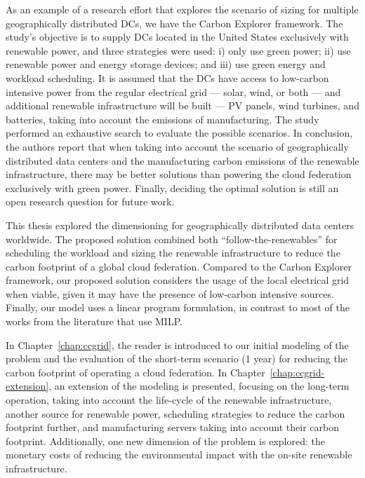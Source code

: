 As an example of a research effort that explores the scenario of sizing for multiple geographically distributed DCs, we have the Carbon Explorer framework\cite{acun2022holistic}. The study's objective is to supply DCs located in the United States exclusively with renewable power, and three strategies were used: i) only use green power; ii) use renewable power and energy storage devices; and iii) use green energy and workload scheduling. It is assumed that the DCs have access to low-carbon intensive power from the regular electrical grid --- solar, wind, or both --- and additional renewable infrastructure will be built --- PV panels, wind turbines, and batteries, taking into account the emissions of manufacturing. The study performed an exhaustive search to evaluate the possible scenarios. In conclusion, the authors report that when taking into account the scenario of geographically distributed data centers and the manufacturing carbon emissions of the renewable infrastructure, there may be better solutions than powering the cloud federation exclusively with green power. Finally, deciding the optimal solution is still an open research question for future work.


This thesis explored the dimensioning for geographically distributed data centers worldwide. The proposed solution combined both ``follow-the-renewables'' for scheduling the workload and sizing the renewable infrastructure to reduce the carbon footprint of a global cloud federation. Compared to the Carbon Explorer framework, our proposed solution considers the usage of the local electrical grid when viable, given it may have the presence of low-carbon intensive sources. Finally, our model uses a linear program formulation, in contrast to most of the works from the literature that use MILP.

In Chapter~\ref{chap:ccgrid}, the reader is introduced to our initial modeling of the problem and the evaluation of the short-term scenario (1 year) for reducing the carbon footprint of operating a cloud federation. In Chapter~\ref{chap:ccgrid-extension}, an extension of the modeling is presented, focusing on the long-term operation, taking into account the life-cycle of the renewable infrastructure, another source for renewable power, scheduling strategies to reduce the carbon footprint further, and manufacturing servers taking into account their carbon footprint. Additionally,  one new dimension of the problem is explored: the monetary costs of reducing the environmental impact with the on-site renewable infrastructure.

